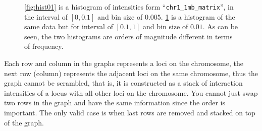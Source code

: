 \documentclass{article}
\begin{document}
\begin{figure}[H]
\begin{subfigure}[b]{.45\textwidth}
        \caption{}
        \label{fig:hist02}
    \end{subfigure}
    \caption{\ref{fig:hist01} is a histogram of intensities form 
    ``\texttt{chr1\_1mb\_matrix}'',
    in the interval of $[0, 0.1]$ and bin size of $0.005$.
    \ref{fig:hist02} is a histogram of the same data
    but for interval of $[0.1, 1]$ and bin size of $0.01$.
    As can be seen, the two histograms are orders of magnitude
    different in terms of frequency.}
    \label{fig:hists}
\end{figure}
Each row and column in the graphs represents a loci on the chromosome,
the next row (column) represents the adjacent loci on the same chromosome,
thus the graph cannot be scrambled, that is, it is constructed as a stack
of interaction intensities of a locus with all other loci on the chromosome.
You cannot just swap two rows in the graph and have the same information since
the order is important. The only valid case is when last rows are removed 
and stacked on top of the graph.
\end{document}
